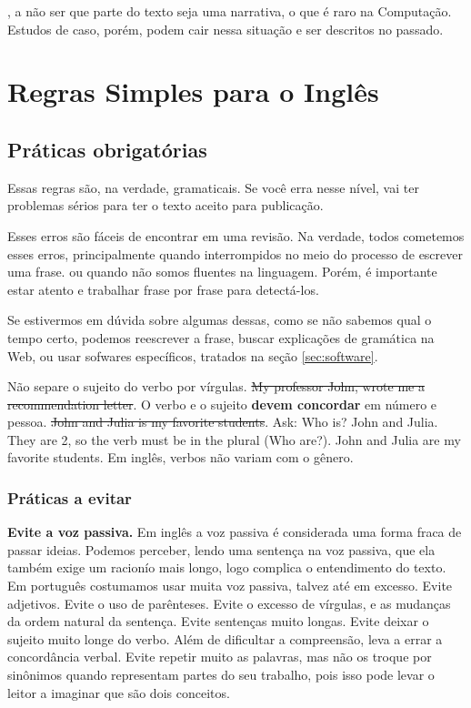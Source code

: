\documentclass[openany]{book}
\begin{document}
, a não ser que parte do texto seja uma narrativa, o que é raro na Computação. Estudos de caso, porém, podem cair nessa situação e ser descritos no passado.

\chapter{Regras Simples para o Inglês}

\section{Práticas obrigatórias}

Essas regras são, na verdade, gramaticais. Se você erra nesse nível, vai ter problemas sérios para ter o texto aceito para publicação.

Esses erros são fáceis de encontrar em uma revisão. Na verdade, todos cometemos esses erros, principalmente quando interrompidos no meio do processo de escrever uma frase. ou quando não somos fluentes na linguagem. Porém, é importante estar atento e trabalhar frase por frase para detectá-los.

Se estivermos em dúvida sobre algumas dessas, como se não sabemos qual o tempo certo, podemos reescrever a frase, buscar explicações de gramática na Web, ou usar sofwares específicos, tratados na seção \ref{sec:software}.

\begin{outline}
    \1 Não separe o sujeito do verbo por vírgulas.
    \2 \sout{My professor John, wrote me a recommendation letter}.
    \1 O verbo e o sujeito \textbf{devem concordar} em número e pessoa.
    \2 \sout{John and Julia is my favorite students}.
        \3 Ask: Who is? John and Julia. They are 2, so the verb must be in the plural (Who are?).
    \2 John and Julia are my favorite students.
    \2 Em inglês, verbos não variam com o gênero.
\end{outline}

\subsection{Práticas a evitar}



\begin{outline}
\1 \textbf{Evite a voz passiva.}
\2 Em inglês a voz passiva é considerada uma forma fraca de passar ideias. Podemos perceber, lendo uma sentença na voz passiva, que ela também exige um racionío mais longo, logo complica o entendimento do texto. Em português costumamos usar muita voz passiva, talvez até em excesso.
\1 Evite adjetivos.
\1 Evite o uso de parênteses.
\1 Evite o excesso de vírgulas, e as mudanças da ordem natural da sentença.
\1 Evite sentenças muito longas.
\1 Evite deixar o sujeito muito longe do verbo.
\2 Além de dificultar a compreensão, leva a errar a concordância verbal.
\1 Evite repetir muito as palavras, mas não os troque por sinônimos quando representam partes do seu trabalho, pois isso pode levar o leitor a imaginar que são dois conceitos.
\end{outline}
\end{document}
